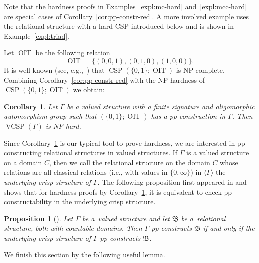 \documentclass[nonacm]{acmart}
\newcommand{\bB}{{\mathfrak B}}
\DeclareMathOperator{\VCSP}{VCSP}
\DeclareMathOperator{\CSP}{CSP}
\DeclareMathOperator{\OIT}{OIT}
\newtheorem{proposition}[theorem]{Proposition}
\newtheorem{corollary}[theorem]{Corollary}
\begin{document}
Note that the hardness proofs in Examples~\ref{expl:mc-hard} and~\ref{expl:mcc-hard} are special cases of Corollary~\ref{cor:pp-constr-red}. A more involved example uses the
relational structure with a hard CSP introduced below and is shown in Example~\ref{expl:triad}.

Let $\OIT$ be the following relation 
$$ \OIT = \{(0,0,1),(0,1,0),(1,0,0) \}.$$
It is well-known (see, e.g.,~\cite{Book}) that $\CSP(\{0,1\};\OIT)$ is NP-complete.
Combining Corollary~\ref{cor:pp-constr-red} with
the NP-hardness of $\CSP(\{0,1\};\OIT)$ we obtain:
\begin{corollary}\label{cor:OIT}
Let $\Gamma$ be a valued structure with a finite signature and oligomorphic automorphism group such that 
$(\{0,1\};\OIT)$ 
has a pp-construction in $\Gamma$. Then $\VCSP(\Gamma)$ is NP-hard. 
\end{corollary}

Since Corollary~\ref{cor:OIT} is our typical tool to prove hardness, we are interested in pp-constructing relational structures in valued structures. If $\Gamma$ is a valued structure on a domain $C$, then we call the relational structure on the domain $C$ whose relations are all classical relations (i.e., with values in $\{0,\infty\}$) in $\langle \Gamma \rangle$ the \emph{underlying crisp structure of $\Gamma$}. The following proposition first appeared in \cite{tvcsp} and shows that for hardness proofs by Corollary~\ref{cor:OIT}, it is equivalent to check pp-constructability in the underlying crisp structure.

\begin{proposition}[{\cite[Proposition 3.2]{tvcsp}}]
\label{prop:pp-constr-rel}
Let $\Gamma$ be a~valued structure and let $\bB$ be a~relational structure, both with countable domains. Then $\Gamma$ pp-constructs $\bB$ if and only if the underlying crisp structure of $\Gamma$ pp-constructs $\bB$.
\end{proposition}

We finish this section by the following useful lemma.
\end{document}
